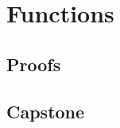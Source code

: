 \chapter{Functions}
\label{chap:functions}

\LRAExcludeFromPrintEditionBegin
\section*{Proofs}

\section*{Capstone}

\LRAExcludeFromPrintEditionEnd
